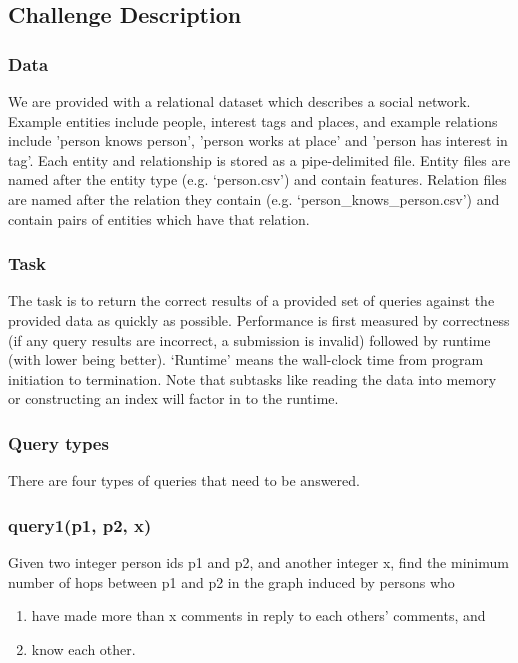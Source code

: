 \documentclass{article}
\begin{document}
\subsection{Challenge Description}

\subsubsection{Data}
We are provided with a relational dataset which describes a social
network.  Example entities include people, interest tags and places, 
and example relations include 'person knows person', 'person works at place'
and 'person has interest in tag'.  Each entity and
relationship is stored as a pipe-delimited file.  Entity files are
named after the entity type (e.g. `person.csv') and contain features.
Relation files are named after the relation they contain
(e.g. `person\_knows\_person.csv') and contain pairs of entities which
have that relation.

\subsubsection{Task}
The task is to return the correct results of a provided set of queries
against the provided data as quickly as possible.  Performance is
first measured by correctness (if any query results are incorrect, a
submission is invalid) followed by runtime (with lower being better).
`Runtime' means the wall-clock time from program initiation to
termination.  Note that subtasks like reading the data into memory or
constructing an index will factor in to the runtime.

\subsubsection{Query types}
There are four types of queries that need to be answered.

\subsubsection{query1(p1, p2, x)}
Given two integer person ids p1 and p2, and another integer x, find
the minimum number of hops between p1 and p2 in the graph induced by
persons who
\begin{enumerate}
\item have made more than x comments in reply to each others'
comments, and
\item know each other.
\end{enumerate}
\end{document}
